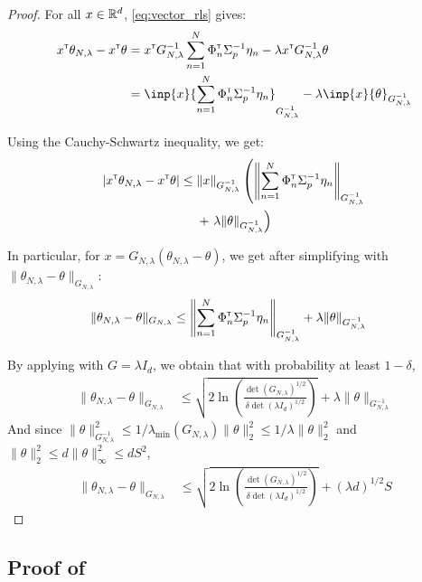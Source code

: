 \documentclass{article}
\begin{document}
\begin{proof}
For all $x\in\mathbb{R}^d$, \eqref{eq:vector_rls} gives:
\begin{align*}
    x^\transp\theta_{N,\lambda}  -x^\transp\theta &= x^\transp G_{N, \lambda}^{-1}\sum_{n=1}^N \Phi_n^\transp \Sigma_p^{-1}\eta_n
    - \lambda x^\transp G_{N, \lambda}^{-1}\theta\\
    &= \inp{x}{\sum_{n=1}^N \Phi_n^\transp \Sigma_p^{-1}\eta_n}_{G_{N, \lambda}^{-1}} - \lambda\inp{x}{\theta}_{G_{N, \lambda}^{-1}}
\end{align*}

Using the Cauchy-Schwartz inequality, we get:
\begin{align*}
    |x^{\mathsf{\scriptscriptstyle T}}\theta_{N,\lambda}  -x^{\mathsf{\scriptscriptstyle T}}\theta| \leq {} & \|x\|_{G_{N, \lambda}^{-1}}\left(\left\|\sum_{n=1}^N \Phi_n^{\mathsf{\scriptscriptstyle T}} \Sigma_p^{-1}\eta_n\right\|_{G_{N, \lambda}^{-1}}\right.\\ 
    &+ \left.\lambda\|\theta\|_{G_{N, \lambda}^{-1}}\right)
\end{align*}

In particular, for $x = G_{N,\lambda}(\theta_{N,\lambda} - \theta)$, we get after simplifying with $\| \theta_{N,\lambda}  - \theta\|_{G_{N,\lambda}}$:
\begin{align*}
    \| \theta_{N,\lambda}  - \theta\|_{G_{N,\lambda}} &\leq \left\|\sum_{n=1}^N \Phi_n^{\mathsf{\scriptscriptstyle T}} \Sigma_p^{-1}\eta_n\right\|_{G_{N, \lambda}^{-1}} + \lambda\|\theta\|_{G_{N, \lambda}^{-1}}
\end{align*}

By applying  with $G=\lambda I_d$, we obtain that with probability at least $1-\delta$,
\begin{align*}
    \| \theta_{N,\lambda}  - \theta\|_{G_{N,\lambda}} &\leq \sqrt{2\ln \left(\frac{\det(G_{N,\lambda})^{1/2}}{\delta\det(\lambda I_d)^{1/2}}\right)}
     + \lambda\|\theta\|_{G_{N, \lambda}^{-1}}
\end{align*}
And since $\|\theta\|_{G_{N, \lambda}^{-1}}^2 \leq 1/\lambda_{\min}(G_{N,\lambda})\|\theta\|_2^2 \leq 1/\lambda \|\theta\|_2^2$ and $\|\theta\|_2^2 \leq d\|\theta\|_\infty^2\leq d S^2$,
\begin{align*}
    \| \theta_{N,\lambda}  - \theta\|_{G_{N,\lambda}} &\leq \sqrt{2\ln \left(\frac{\det(G_{N,\lambda})^{1/2}}{\delta\det(\lambda I_d)^{1/2}}\right)}
     + (\lambda d)^{1/2}S
\end{align*}
\end{proof}


\subsection{Proof of }
\end{document}
